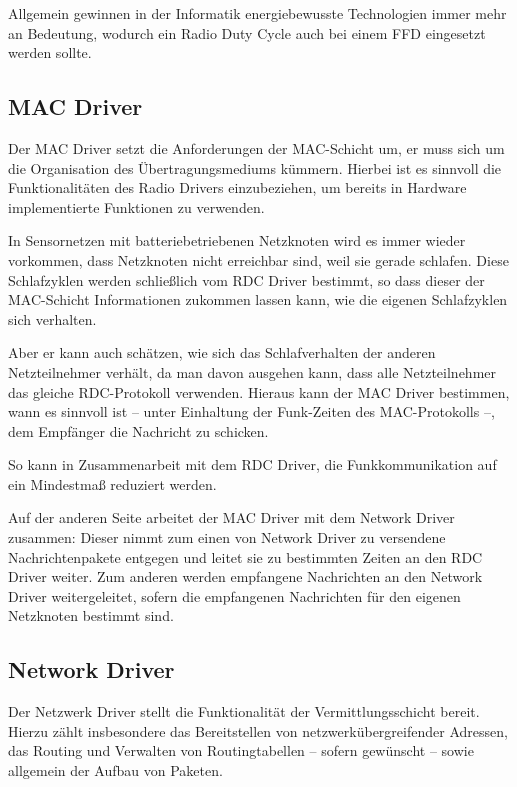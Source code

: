 	Allgemein gewinnen in der Informatik energiebewusste Technologien immer
	mehr an Bedeutung, wodurch ein Radio Duty Cycle auch bei einem
	\acl{FFD} eingesetzt werden sollte.

\subsection{MAC Driver}
	Der MAC Driver setzt die Anforderungen der MAC-Schicht um, \dhx er muss
	sich um die Organisation des Übertragungsmediums kümmern.  Hierbei ist
	es sinnvoll die Funktionalitäten des Radio Drivers einzubeziehen, um
	bereits in Hardware implementierte Funktionen zu verwenden.

	In Sensornetzen mit batteriebetriebenen Netzknoten wird es immer wieder
	vorkommen, dass Netzknoten nicht erreichbar sind, weil sie gerade
	schlafen.  Diese Schlafzyklen werden schließlich vom RDC Driver
	bestimmt, so dass dieser der MAC-Schicht Informationen zukommen lassen
	kann, wie die eigenen Schlafzyklen sich verhalten.

	Aber er kann auch schätzen, wie sich das Schlafverhalten der anderen
	Netzteilnehmer verhält, da man \idR davon ausgehen kann, dass alle
	Netzteilnehmer das gleiche RDC-Protokoll verwenden.  Hieraus kann der
	MAC Driver bestimmen, wann es sinnvoll ist -- unter Einhaltung der
	Funk-Zeiten des MAC-Protokolls --, dem Empfänger die Nachricht zu
	schicken.

	So kann in Zusammenarbeit mit dem RDC Driver, die Funkkommunikation auf
	ein Mindestmaß reduziert werden.

	Auf der anderen Seite arbeitet der MAC Driver mit dem Network Driver
	zusammen: Dieser nimmt zum einen von Network Driver zu versendene
	Nachrichtenpakete entgegen und leitet sie zu bestimmten Zeiten an den
	RDC Driver weiter.  Zum anderen werden empfangene Nachrichten an den
	Network Driver weitergeleitet, sofern die empfangenen Nachrichten für
	den eigenen Netzknoten bestimmt sind.

\subsection{Network Driver}

	Der Netzwerk Driver stellt die Funktionalität der Vermittlungsschicht
	bereit. Hierzu zählt insbesondere das Bereitstellen von
	netzwerkübergreifender Adressen, das Routing und Verwalten von
	Routingtabellen -- sofern gewünscht -- sowie allgemein der Aufbau von
	Paketen.

